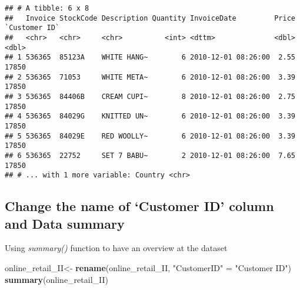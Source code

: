 \documentclass[
]{article}
\newenvironment{Shaded}{\begin{snugshade}}{\end{snugshade}}
\newcommand{\KeywordTok}[1]{\textcolor[rgb]{0.13,0.29,0.53}{\textbf{#1}}}
\newcommand{\NormalTok}[1]{#1}
\newcommand{\StringTok}[1]{\textcolor[rgb]{0.31,0.60,0.02}{#1}}
\begin{document}
\begin{verbatim}
## # A tibble: 6 x 8
##   Invoice StockCode Description Quantity InvoiceDate         Price `Customer ID`
##   <chr>   <chr>     <chr>          <int> <dttm>              <dbl>         <dbl>
## 1 536365  85123A    WHITE HANG~        6 2010-12-01 08:26:00  2.55         17850
## 2 536365  71053     WHITE META~        6 2010-12-01 08:26:00  3.39         17850
## 3 536365  84406B    CREAM CUPI~        8 2010-12-01 08:26:00  2.75         17850
## 4 536365  84029G    KNITTED UN~        6 2010-12-01 08:26:00  3.39         17850
## 5 536365  84029E    RED WOOLLY~        6 2010-12-01 08:26:00  3.39         17850
## 6 536365  22752     SET 7 BABU~        2 2010-12-01 08:26:00  7.65         17850
## # ... with 1 more variable: Country <chr>
\end{verbatim}

\hypertarget{change-the-name-of-customer-id-column-and-data-summary}{%
\subsection{Change the name of `Customer ID' column and Data
summary}\label{change-the-name-of-customer-id-column-and-data-summary}}

Using \emph{summary()} function to have an overview at the dataset

\begin{Shaded}
\begin{Highlighting}[]
\NormalTok{online_retail_II<-}\StringTok{ }\KeywordTok{rename}\NormalTok{(online_retail_II, }\StringTok{"CustomerID"}\NormalTok{ =}\StringTok{ "Customer ID"}\NormalTok{)}
\KeywordTok{summary}\NormalTok{(online_retail_II)}
\end{Highlighting}
\end{Shaded}
\end{document}
